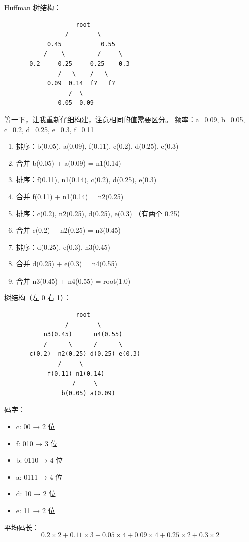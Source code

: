 \documentclass[10pt,a4paper,openany]{ctexbook}
\theoremstyle{definition}
\theoremstyle{remark}
\begin{document}
Huffman 树结构：
{\footnotesize\begin{verbatim}
                    root
                 /        \
            0.45           0.55
           /    \         /     \
       0.2     0.25     0.25    0.3
               /   \    /   \
            0.09  0.14  f?   f?
                  /  \
               0.05  0.09
\end{verbatim}}

等一下，让我重新仔细构建，注意相同的值需要区分。
频率：a=0.09, b=0.05, c=0.2, d=0.25, e=0.3, f=0.11
\begin{enumerate}
\item 排序：b(0.05), a(0.09), f(0.11), c(0.2), d(0.25), e(0.3)
\item 合并 b(0.05) + a(0.09) = n1(0.14)
\item 排序：f(0.11), n1(0.14), c(0.2), d(0.25), e(0.3)
\item 合并 f(0.11) + n1(0.14) = n2(0.25)
\item 排序：c(0.2), n2(0.25), d(0.25), e(0.3) （有两个 0.25）
\item 合并 c(0.2) + n2(0.25) = n3(0.45)
\item 排序：d(0.25), e(0.3), n3(0.45)
\item 合并 d(0.25) + e(0.3) = n4(0.55)
\item 合并 n3(0.45) + n4(0.55) = root(1.0)

\end{enumerate}

树结构（左 0 右 1）：
{\footnotesize\begin{verbatim}
                    root
                 /        \
           n3(0.45)      n4(0.55)
           /      \      /      \
       c(0.2)  n2(0.25) d(0.25) e(0.3)
               /     \
            f(0.11) n1(0.14)
                   /     \
                b(0.05) a(0.09)
\end{verbatim}}

码字：
\begin{itemize}
\item c: 00    → 2 位
\item f: 010   → 3 位
\item b: 0110  → 4 位
\item a: 0111  → 4 位
\item d: 10    → 2 位
\item e: 11    → 2 位

\end{itemize}

平均码长：
\[
0.2 \times 2 + 0.11 \times 3 + 0.05 \times 4 + 0.09 \times 4 + 0.25 \times 2 + 0.3 \times 2
\]
\end{document}
